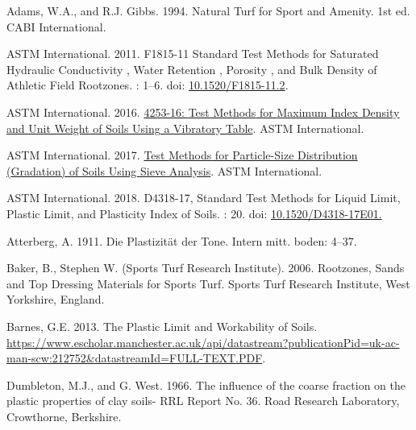 \documentclass[
  letterpaper,
]{article}
\newlength{\cslhangindent}
\newlength{\cslentryspacingunit} %
\newenvironment{CSLReferences}[2] %
 {%
  \setlength{\parindent}{0pt}
  \ifodd #1
  \let\oldpar\par
  \def\par{\hangindent=\cslhangindent\oldpar}
  \fi
  \setlength{\parskip}{#2\cslentryspacingunit}
 }%
 {}
\begin{document}
\hypertarget{refs}{}
\begin{CSLReferences}{1}{0}
\leavevmode{}%
Adams, W.A., and R.J. Gibbs. 1994. Natural {Turf} for {Sport} and {Amenity}. 1st ed. {CABI International}.

\leavevmode{}%
ASTM International. 2011. F1815-11 {Standard Test Methods} for {Saturated Hydraulic Conductivity} , {Water Retention} , {Porosity} , and {Bulk Density} of {Athletic Field Rootzones}. : 1--6. doi: \href{https://doi.org/10.1520/F1815-11.2}{10.1520/F1815-11.2}.

\leavevmode{}%
ASTM International. 2016. \href{https://doi.org/10.1520/D4253-16}{4253-16: {Test Methods} for {Maximum Index Density} and {Unit Weight} of {Soils Using} a {Vibratory Table}}. {ASTM International}.

\leavevmode{}%
ASTM International. 2017. \href{https://doi.org/10.1520/D6913_D6913M-17}{Test {Methods} for {Particle-Size Distribution} ({Gradation}) of {Soils Using Sieve Analysis}}. {ASTM International}.

\leavevmode{}%
ASTM International. 2018. D4318-17, {Standard Test Methods} for {Liquid Limit}, {Plastic Limit}, and {Plasticity Index} of {Soils}. : 20. doi: \href{https://doi.org/10.1520/D4318-17E01.}{10.1520/D4318-17E01.}

\leavevmode{}%
Atterberg, A. 1911. Die {Plastizität} der {Tone}. Intern mitt. boden: 4--37.

\leavevmode{}%
Baker, B., Stephen W. (Sports Turf Research Institute). 2006. Rootzones, {Sands} and {Top Dressing Materials} for {Sports Turf}. {Sports Turf Research Institute}, {West Yorkshire, England}.

\leavevmode{}%
Barnes, G.E. 2013. The {Plastic Limit} and {Workability} of {Soils}. \url{https://www.escholar.manchester.ac.uk/api/datastream?publicationPid=uk-ac-man-scw:212752\&datastreamId=FULL-TEXT.PDF}.

\leavevmode{}%
Dumbleton, M.J., and G. West. 1966. The influence of the coarse fraction on the plastic properties of clay soils- {RRL Report No}. 36. {Road Research Laboratory}, {Crowthorne, Berkshire}.


\end{CSLReferences}
\end{document}
